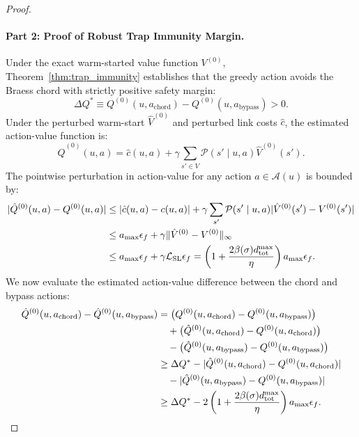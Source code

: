 \documentclass[11pt,a4paper]{article}
\begin{document}
\begin{proof}
\paragraph{Part 2: Proof of Robust Trap Immunity Margin.}
Under the exact warm-started value function $V^{(0)}$, Theorem~\ref{thm:trap_immunity} establishes that the greedy action avoids the Braess chord with strictly positive safety margin:
\begin{equation}
\Delta Q^* \equiv Q^{(0)}(u, a_{\text{chord}}) - Q^{(0)}(u, a_{\text{bypass}}) > 0.
\end{equation}
Under the perturbed warm-start $\hat{V}^{(0)}$ and perturbed link costs $\hat{c}$, the estimated action-value function is:
\begin{equation}
\hat{Q}^{(0)}(u, a) = \hat{c}(u, a) + \gamma \sum_{s' \in V} \mathcal{P}(s' \mid u, a) \hat{V}^{(0)}(s').
\end{equation}
The pointwise perturbation in action-value for any action $a \in \mathcal{A}(u)$ is bounded by:
\begin{align}
|\hat{Q}^{(0)}(u, a) - Q^{(0)}(u, a)| &\le |\hat{c}(u, a) - c(u, a)| + \gamma \sum_{s'} \mathcal{P}(s' \mid u, a) |\hat{V}^{(0)}(s') - V^{(0)}(s')| \notag \\
&\le a_{\max} \epsilon_f + \gamma \|\hat{V}^{(0)} - V^{(0)}\|_\infty \notag \\
&\le a_{\max} \epsilon_f + \gamma \mathcal{L}_{\text{SL}} \epsilon_f = \left( 1 + \frac{2 \beta(\sigma) d_{\text{tot}}^{\max}}{\eta} \right) a_{\max} \epsilon_f.
\end{align}
We now evaluate the estimated action-value difference between the chord and bypass actions:
\begin{align}
\hat{Q}^{(0)}(u, a_{\text{chord}}) - \hat{Q}^{(0)}(u, a_{\text{bypass}}) &= \big( Q^{(0)}(u, a_{\text{chord}}) - Q^{(0)}(u, a_{\text{bypass}}) \big) \notag \\
&\quad + \big( \hat{Q}^{(0)}(u, a_{\text{chord}}) - Q^{(0)}(u, a_{\text{chord}}) \big) \notag \\
&\quad - \big( \hat{Q}^{(0)}(u, a_{\text{bypass}}) - Q^{(0)}(u, a_{\text{bypass}}) \big) \notag \\
&\ge \Delta Q^* - |\hat{Q}^{(0)}(u, a_{\text{chord}}) - Q^{(0)}(u, a_{\text{chord}})| \notag \\
&\quad - |\hat{Q}^{(0)}(u, a_{\text{bypass}}) - Q^{(0)}(u, a_{\text{bypass}})| \notag \\
&\ge \Delta Q^* - 2 \left( 1 + \frac{2 \beta(\sigma) d_{\text{tot}}^{\max}}{\eta} \right) a_{\max} \epsilon_f.

\end{align}
\end{proof}
\end{document}
